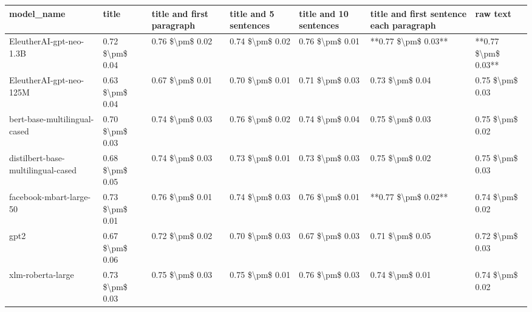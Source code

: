 \begin{tabular}{lllllll}
\toprule
                        model\_name &           title & title and first paragraph & title and 5 sentences & title and 10 sentences & title and first sentence each paragraph &            raw text \\
\midrule
           EleutherAI-gpt-neo-1.3B & 0.72 \$\textbackslash pm\$ 0.04 &           0.76 \$\textbackslash pm\$ 0.02 &       0.74 \$\textbackslash pm\$ 0.02 &        0.76 \$\textbackslash pm\$ 0.01 &                     **0.77 \$\textbackslash pm\$ 0.03** & **0.77 \$\textbackslash pm\$ 0.03** \\
           EleutherAI-gpt-neo-125M & 0.63 \$\textbackslash pm\$ 0.04 &           0.67 \$\textbackslash pm\$ 0.01 &       0.70 \$\textbackslash pm\$ 0.01 &        0.71 \$\textbackslash pm\$ 0.03 &                         0.73 \$\textbackslash pm\$ 0.04 &     0.75 \$\textbackslash pm\$ 0.03 \\
      bert-base-multilingual-cased & 0.70 \$\textbackslash pm\$ 0.03 &           0.74 \$\textbackslash pm\$ 0.03 &       0.76 \$\textbackslash pm\$ 0.02 &        0.74 \$\textbackslash pm\$ 0.04 &                         0.75 \$\textbackslash pm\$ 0.03 &     0.75 \$\textbackslash pm\$ 0.02 \\
distilbert-base-multilingual-cased & 0.68 \$\textbackslash pm\$ 0.05 &           0.74 \$\textbackslash pm\$ 0.03 &       0.73 \$\textbackslash pm\$ 0.01 &        0.73 \$\textbackslash pm\$ 0.03 &                         0.75 \$\textbackslash pm\$ 0.02 &     0.75 \$\textbackslash pm\$ 0.03 \\
           facebook-mbart-large-50 & 0.73 \$\textbackslash pm\$ 0.01 &           0.76 \$\textbackslash pm\$ 0.01 &       0.74 \$\textbackslash pm\$ 0.03 &        0.76 \$\textbackslash pm\$ 0.01 &                     **0.77 \$\textbackslash pm\$ 0.02** &     0.74 \$\textbackslash pm\$ 0.02 \\
                              gpt2 & 0.67 \$\textbackslash pm\$ 0.06 &           0.72 \$\textbackslash pm\$ 0.02 &       0.70 \$\textbackslash pm\$ 0.03 &        0.67 \$\textbackslash pm\$ 0.03 &                         0.71 \$\textbackslash pm\$ 0.05 &     0.72 \$\textbackslash pm\$ 0.03 \\
                 xlm-roberta-large & 0.73 \$\textbackslash pm\$ 0.03 &           0.75 \$\textbackslash pm\$ 0.03 &       0.75 \$\textbackslash pm\$ 0.01 &        0.76 \$\textbackslash pm\$ 0.03 &                         0.74 \$\textbackslash pm\$ 0.01 &     0.74 \$\textbackslash pm\$ 0.02 \\
\bottomrule
\end{tabular}

